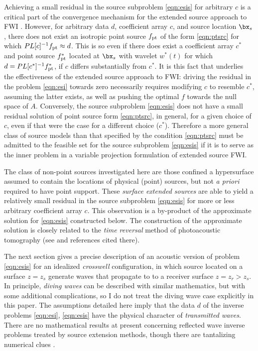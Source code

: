 Achieving a small residual in the source subproblem \ref{eqn:esis} for arbitrary $c$ is a critical part of the convergence mechanism for the extended source approach to FWI \cite[]{HuangNammourSymesDollizal:SEG19}. However, for arbitrary data $d$, coefficient array $c$, and source location $\bx_s$, there does not exist an isotropic point source $f_{\rm pt}$ of the form \ref{eqn:ptsrc} for which $PL[c]^{-1}f_{\rm pt} \approx d$. This is so even if there does exist a coefficient array $c^*$ and point source $f_{\rm pt}^*$ located at $\bx_s$ with wavelet $w^*(t)$ for which $d = PL[c^*]^{-1}f_{\rm pt}^*$, if $c$ differs substantially from $c^*$. It is this fact that underlies the effectiveness of the extended source approach to FWI:  driving the residual in the problem \ref{eqn:esi} towards zero necessarily requires modifying $c$ to resemble $c^*$, assuming the latter exists, as well as pushing the optimal $f$ towards the null space of $A$. Conversely, the source subproblem \ref{eqn:esis} does not have a small residual solution of point source form \ref{eqn:ptsrc}, in general, for a given choice of $c$, even if that were the case for a different choice ($c^*$). Therefore a more general class of source models than that specified by the condition \ref{eqn:ptsrc} must be admitted to the feasible set for the source subproblem \ref{eqn:esis} if it is to serve as the inner problem in a variable projection formulation of extended source FWI.

The class of non-point sources investigated here are those confined a hypersurface assumed to contain the locations of physical (point) sources, but not {\em a priori} required to have point support. These {\em surface extended sources} are able to yield a relatively small residual in the source subproblem \ref{eqn:esis} for more or less arbitrary coefficient array $c$. This observation is a by-product of the approximate solution for \ref{eqn:esis} constructed below. The construction of the approximate solution is closely related to the {\em time reversal} method of photoacoustic tomography (see \cite{StefanovUhlmannIP:09} and references cited there).

The next section gives a precise description of an acoustic version of problem \ref{eqn:esis} for an idealized {\em crosswell} configuration, in which source located on a surface $z=z_s$ generate waves that propagate to to a receiver surface $z=z_r > z_s$. In principle, {\em diving waves} can be described with similar mathematics, but with some additional complications, so I do not treat the diving wave case explicitly in this paper. The assumptions detailed here imply that the data $d$ of the inverse problems \ref{eqn:esi}, \ref{eqn:esis} have the physical character of {\em transmitted waves}. There are no mathematical results at present concerning reflected wave inverse problems treated by source extension methods, though there are tantalizing numerical clues \cite[]{LeeuwenHerrmannWRI:13,Warner:14,Warner:16,LeeuwenHerrmann:16,HuangSymes:Geo17,HuangSymes:Geo18a,HuangSymes:Geo18b}.

